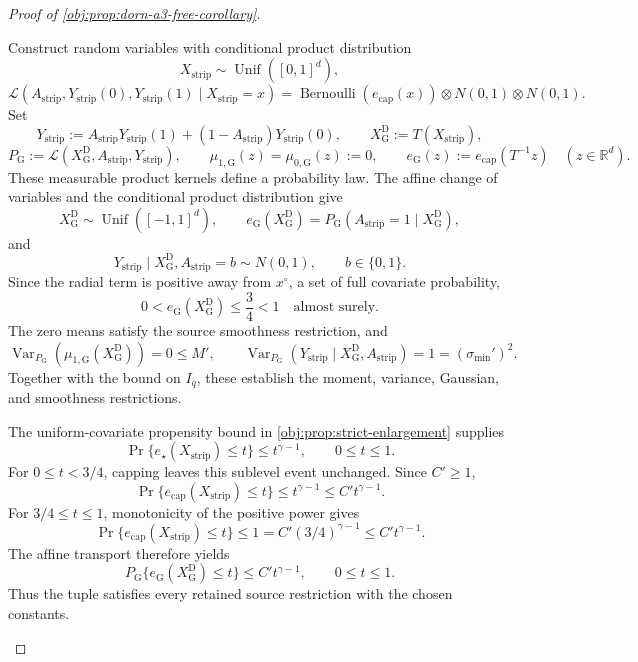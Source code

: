 \documentclass[11pt]{article}
\begin{document}
\begin{proof}[Proof of \cref{obj:prop:dorn-a3-free-corollary}]
\begin{enumerate}
Construct random variables with conditional product distribution
\[
X_{\mathrm{strip}}\sim\operatorname{Unif}([0,1]^d),
\]
\[
\mathcal L\!\left(
A_{\mathrm{strip}},Y_{\mathrm{strip}}(0),Y_{\mathrm{strip}}(1)
\mid X_{\mathrm{strip}}=x
\right)
=
\operatorname{Bernoulli}(e_{\mathrm{cap}}(x))
\otimes N(0,1)\otimes N(0,1).
\]
Set
\[
Y_{\mathrm{strip}}
:=
A_{\mathrm{strip}}Y_{\mathrm{strip}}(1)
+(1-A_{\mathrm{strip}})Y_{\mathrm{strip}}(0),
\qquad
X_{\mathrm G}^{\mathrm D}:=T(X_{\mathrm{strip}}),
\]
\[
P_{\mathrm G}:=
\mathcal L(X_{\mathrm G}^{\mathrm D},A_{\mathrm{strip}},Y_{\mathrm{strip}}),
\qquad
\mu_{1,\mathrm G}(z)=\mu_{0,\mathrm G}(z):=0,
\qquad
e_{\mathrm G}(z):=e_{\mathrm{cap}}(T^{-1}z)
\quad(z\in\mathbb R^d).
\]
These measurable product kernels define a probability law. The affine change of variables and the conditional product distribution give
\[
X_{\mathrm G}^{\mathrm D}\sim\operatorname{Unif}([-1,1]^d),
\qquad
e_{\mathrm G}(X_{\mathrm G}^{\mathrm D})
=
P_{\mathrm G}(A_{\mathrm{strip}}=1\mid X_{\mathrm G}^{\mathrm D}),
\]
and
\[
Y_{\mathrm{strip}}
\mid X_{\mathrm G}^{\mathrm D},A_{\mathrm{strip}}=b
\sim N(0,1),
\qquad b\in\{0,1\}.
\]
Since the radial term is positive away from \(x^\circ\), a set of full covariate probability,
\[
0<e_{\mathrm G}(X_{\mathrm G}^{\mathrm D})\le\frac34<1
\quad\text{almost surely}.
\]
The zero means satisfy the source smoothness restriction, and
\[
\operatorname{Var}_{P_{\mathrm G}}(\mu_{1,\mathrm G}(X_{\mathrm G}^{\mathrm D}))=0\le M',
\qquad
\operatorname{Var}_{P_{\mathrm G}}(Y_{\mathrm{strip}}\mid
X_{\mathrm G}^{\mathrm D},A_{\mathrm{strip}})=1=(\sigma_{\min}')^2.
\]
Together with the bound on \(I_q\), these establish the moment, variance, Gaussian, and smoothness restrictions.

The uniform-covariate propensity bound in
\cref{obj:prop:strict-enlargement} supplies
\[
\Pr\{e_\star(X_{\mathrm{strip}})\le t\}\le t^{\gamma-1},
\qquad 0\le t\le1.
\]
For \(0\le t<3/4\), capping leaves this sublevel event unchanged. Since \(C'\ge1\),
\[
\Pr\{e_{\mathrm{cap}}(X_{\mathrm{strip}})\le t\}
\le t^{\gamma-1}\le C't^{\gamma-1}.
\]
For \(3/4\le t\le1\), monotonicity of the positive power gives
\[
\Pr\{e_{\mathrm{cap}}(X_{\mathrm{strip}})\le t\}
\le1
=
C'(3/4)^{\gamma-1}
\le C't^{\gamma-1}.
\]
The affine transport therefore yields
\[
P_{\mathrm G}\{e_{\mathrm G}(X_{\mathrm G}^{\mathrm D})\le t\}
\le C't^{\gamma-1},
\qquad 0\le t\le1.
\]
Thus the tuple satisfies every retained source restriction with the chosen constants.


\end{enumerate}
\end{proof}
\end{document}
